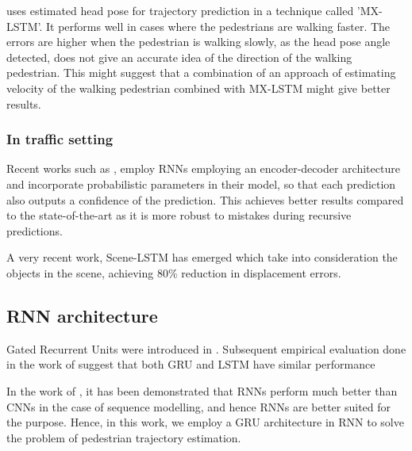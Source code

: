 \cite{hasan_mx-lstm:_2018} uses estimated head pose for trajectory prediction in a technique called 'MX-LSTM'. It performs well in cases where the pedestrians are walking faster. The errors are higher when the pedestrian is walking slowly, as the head pose angle detected, does not give an accurate idea of the direction of the walking pedestrian. This might suggest that a combination of an approach of estimating velocity of the walking pedestrian combined with MX-LSTM might give better results.



\subsubsection{In traffic setting}
Recent works such as \cite{bhattacharyya_long-term_2017}, employ RNNs employing an encoder-decoder architecture and incorporate probabilistic parameters in their model, so that each prediction also outputs a confidence of the prediction. This achieves better results compared to the state-of-the-art as it is more robust to mistakes during recursive predictions.

A very recent work, Scene-LSTM \cite{manh_scene-lstm:_2018} has emerged which take into consideration the objects in the scene, achieving 80\% reduction in displacement errors.

\subsection{RNN architecture}

Gated Recurrent Units were introduced in \cite{cho_properties_2014}. Subsequent empirical evaluation done in the work of \cite{chung_empirical_2014} suggest that both GRU and LSTM have similar performance

In the work of \cite{yin_comparative_2017}, it has been demonstrated that RNNs perform much better than CNNs in the case of sequence modelling, and hence RNNs are better suited for the purpose. Hence, in this work, we employ a GRU architecture in RNN to solve the problem of pedestrian trajectory estimation.

